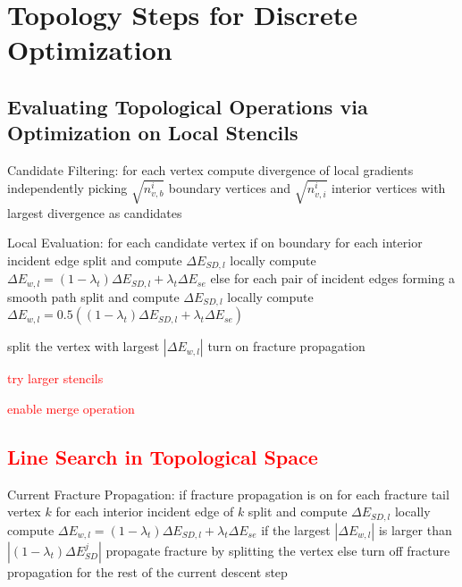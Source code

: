 \section{Topology Steps for Discrete Optimization}

\subsection{Evaluating Topological Operations via Optimization on Local Stencils}

Candidate Filtering:
for each vertex
  compute divergence of local gradients
independently picking $\sqrt{n_{v,b}^i}$ boundary vertices and $\sqrt{n_{v,i}^i}$ interior vertices with largest divergence as candidates

Local Evaluation:
for each candidate vertex
  if on boundary
    for each interior incident edge
      split and compute $\Delta E_{SD,l}$ locally
      compute $\Delta E_{w,l} = (1 - \lambda_t) \Delta E_{SD,l} + \lambda_t \Delta E_{se}$
  else
    for each pair of incident edges forming a smooth path
      split and compute $\Delta E_{SD,l}$ locally
      compute $\Delta E_{w,l} = 0.5((1 - \lambda_t) \Delta E_{SD,l} + \lambda_t \Delta E_{se})$

split the vertex with largest $|\Delta E_{w,l}|$
turn on fracture propagation

\textcolor{red}{try larger stencils}

\textcolor{red}{enable merge operation}

\textcolor{red}{\subsection{Line Search in Topological Space}}

Current Fracture Propagation:
if fracture propagation is on
  for each fracture tail vertex $k$
    for each interior incident edge of $k$
      split and compute $\Delta E_{SD, l}$ locally
      compute $\Delta E_{w,l} = (1 - \lambda_t) \Delta E_{SD,l} + \lambda_t \Delta E_{se}$
  if the largest $|\Delta E_{w,l}|$ is larger than $|(1-\lambda_t)\Delta E_{SD}^j|$
    propagate fracture by splitting the vertex
  else
    turn off fracture propagation for the rest of the current descent step